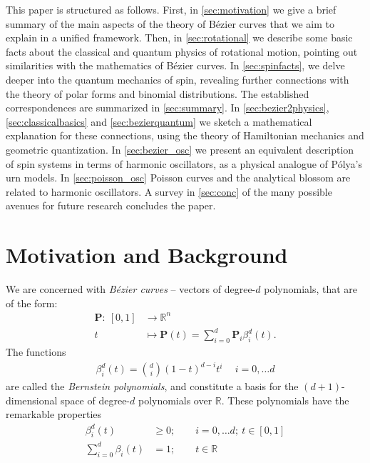 \documentclass[final,3p,mathptmx]{elsarticle}
\begin{document}
This paper is structured as follows. First, in \autoref{sec:motivation} we give a brief summary of the main aspects of the theory of B\'{e}zier curves that we aim to explain in a unified framework. Then, in \autoref{sec:rotational} we describe some basic facts about the classical and quantum physics of rotational motion, pointing out similarities with the mathematics of B\'{e}zier curves. In \autoref{sec:spinfacts}, we delve deeper into the quantum mechanics of spin, revealing further connections with the theory of polar forms and binomial distributions. The established correspondences are summarized in \autoref{sec:summary}. In \autoref{sec:bezier2physics}, \autoref{sec:classicalbasics} and \autoref{sec:bezierquantum} we sketch a mathematical explanation for these connections, using the theory of Hamiltonian mechanics and geometric quantization. In \autoref{sec:bezier_osc} we present an equivalent description of spin systems in terms of harmonic oscillators, as a physical analogue of P\'{o}lya's urn models. In \autoref{sec:poisson_osc} Poisson curves and the analytical blossom are related to harmonic oscillators. A survey in \autoref{sec:conc} of the many possible avenues for future research concludes the paper.

\section{Motivation and Background}\label{sec:motivation}
We are concerned with \emph{B\'{e}zier curves} -- vectors of degree-$d$ polynomials, that are of the form:
\begin{align}
\mathbf{P}:\ \left[ 0,1 \right]  & \longrightarrow \mathbb{R}^{n}\\
t &\longmapsto \mathbf{P}(t) = \sum_{i = 0}^{d}\mathbf{P}_{i}\beta_{i}^{d}(t).
\end{align}
The functions
\begin{align}
\beta_{i}^{d}(t) = {d \choose i}(1-t)^{d-i}t^{i} &\ \  i = 0, \ldots d
\end{align}
are called the \emph{Bernstein polynomials}, and constitute a basis for the $(d+1)$-dimensional space of degree-$d$ polynomials over $\mathbb{R}$. These polynomials have the remarkable properties
\begin{align}
\beta_{i}^{d}(t) &\geq 0;\qquad i = 0, \ldots d;\ t \in \left[0,1\right] \tag{Positivity}  \\
\sum_{i = 0}^{d}\beta_{i}(t) &= 1;\qquad t \in \mathbb{R} \tag{Partition of Unity}
\end{align}
\end{document}

